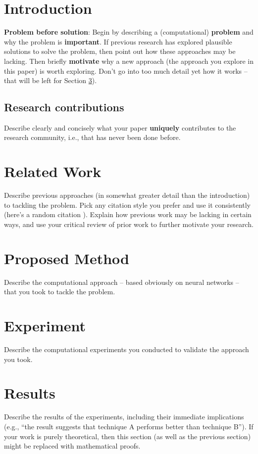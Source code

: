 \documentclass{article}
\begin{document}
\section{Introduction}
{\bf Problem before solution}:
Begin by describing a (computational) {\bf problem} and why the problem is {\bf important}. If previous research has
explored plausible solutions to solve the problem, then point out how these approaches may be lacking. Then briefly {\bf motivate}
why a new approach (the approach you explore in this paper) is worth exploring. Don't go into too much detail yet how it works -- that will
be left for Section \ref{sec:proposed_method}).

\subsection{Research contributions}
Describe clearly and concisely what your paper {\bf uniquely} contributes to the research community, i.e., that has never been done before.

\section{Related Work}
Describe previous approaches (in somewhat greater detail than the introduction) to tackling the problem. Pick any citation style you prefer and use it
consistently (here's a random citation \cite{mitchell80}). Explain how previous work may be lacking in certain ways, and use your critical review
of prior work to further motivate your research.

\section{Proposed Method}
\label{sec:proposed_method}
Describe the computational approach -- based obviously on neural networks -- that you took to tackle the problem.

\section{Experiment}
Describe the computational experiments you conducted to validate the approach you took.

\section{Results}
Describe the results of the experiments, including their immediate implications (e.g., ``the result suggests that technique A performs better
than technique B''). If your work is purely theoretical, then this section (as well as the previous section) might be replaced with mathematical proofs.
\end{document}
